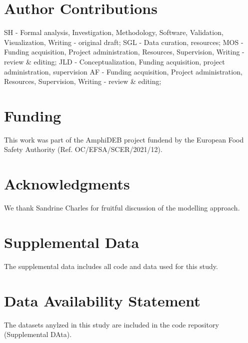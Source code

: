 \documentclass[utf8]{FrontiersinHarvard} %
\begin{document}
\section*{Author Contributions}

SH - Formal analysis, Investigation, Methodology, Software, Validation, Visualization, Writing - original draft;
SGL - Data curation, resources;
MOS - Funding acquisition, Project administration, Resources, Supervision, Writing - review \& editing;
JLD - Conceptualization, Funding acquisition, project administration, supervision
AF - Funding acquisition, Project administration, Resources, Supervision, Writing - review \& editing;

\section*{Funding}
This work was part of the AmphiDEB project fundend by the European Food Safety Authority (Ref. OC/EFSA/SCER/2021/12).

\section*{Acknowledgments}
We thank Sandrine Charles for fruitful discussion of the modelling approach.

\section*{Supplemental Data}
The supplemental data includes all code and data used for this study.

\section*{Data Availability Statement}
The datasets anylzed in this study are included in the code repository (Supplemental DAta).


\end{document}
